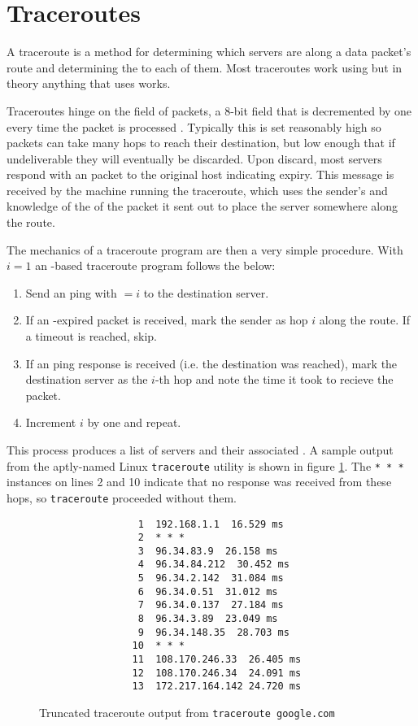 \section{Traceroutes}\label{sec:background_traceroutes}

A \gls{traceroute} is a method for determining which servers are along a data packet's route and determining the \rtt to each of them. Most traceroutes
work using \icmp but in theory anything that uses \ip works.

Traceroutes hinge on the \ttl field of \ip packets, a 8-bit field that is decremented by one every time the packet is processed \cite{rfc791}. Typically this is set reasonably high so packets can take many hops to reach their destination, but low enough that if undeliverable they will eventually be discarded. Upon discard, most servers respond with an \icmp packet to the original host indicating \ttl expiry. This message is received by the machine running the traceroute, which uses the sender's \ip and knowledge of the \ttl of the packet it sent out to place the server somewhere along the route.

The mechanics of a traceroute program are then a very simple procedure. With $i=1$ an \icmp-based traceroute program follows the below:

\begin{enumerate}
    \item Send an \icmp ping with \TTL$=i$ to the destination server.
    \item If an \icmp \ttl-expired packet is received, mark the sender as hop $i$ along the route. If a timeout is reached, skip.
    \item If an \icmp ping response is received (i.e. the destination was reached), mark the destination server as the $i$-th hop and note the time it took to recieve the packet.
    \item Increment $i$ by one and repeat.
\end{enumerate}

This process produces a list of servers and their associated \rtts. A sample output from the aptly-named Linux \texttt{traceroute} utility is shown in figure \ref{fig:sample_traceroute}. The \texttt{* * *} instances on lines 2 and 10 indicate that no response was received from these hops, so \texttt{traceroute} proceeded without them.

\begin{figure}
    \centering
    \begin{verbatim}
                 1  192.168.1.1  16.529 ms
                 2  * * *
                 3  96.34.83.9  26.158 ms
                 4  96.34.84.212  30.452 ms
                 5  96.34.2.142  31.084 ms
                 6  96.34.0.51  31.012 ms
                 7  96.34.0.137  27.184 ms
                 8  96.34.3.89  23.049 ms
                 9  96.34.148.35  28.703 ms
                10  * * *
                11  108.170.246.33  26.405 ms
                12  108.170.246.34  24.091 ms
                13  172.217.164.142 24.720 ms
    \end{verbatim}
    \caption{Truncated traceroute output from \texttt{traceroute google.com}}
    \label{fig:sample_traceroute}
\end{figure}
